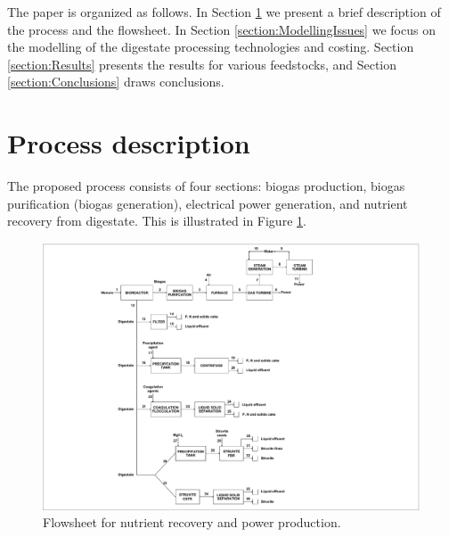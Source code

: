 \begin{refsection}[referencesCh2]
The paper is organized as follows. In Section \ref{section:ProcessDescription} we present a brief description of the process and the flowsheet. In Section \ref{section:ModellingIssues} we focus on the modelling of the digestate processing technologies and costing. Section \ref{section:Results} presents the results for various feedstocks, and Section \ref{section:Conclusions} draws conclusions.

\section{Process description} \label{section:ProcessDescription}
The proposed process consists of four sections: biogas production, biogas purification (biogas generation), electrical power generation, and nutrient recovery from digestate. This is illustrated in Figure \ref{fig:Flowsheet}.

\begin{figure}[h!]
	\centering
	\includegraphics[width=1\linewidth, trim={6.5cm 0.1cm 11.5cm 0.3cm},clip]{gfx/Chapter2/superstructure3bloquesCOMPATIBILIDAD-Layout3.pdf} 
	\caption{Flowsheet for nutrient recovery and power production.}
	\label{fig:Flowsheet}
\end{figure}


\end{refsection}
